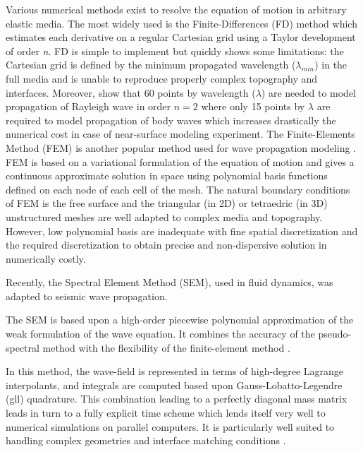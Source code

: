 \documentclass[manuscript,revised]{geophysics}
\begin{document}
\noindent Various numerical methods exist to resolve the equation of motion in arbitrary elastic media. The most widely used is the Finite-Differences (FD) method \citep{Virieux_PSV_1986,Levander_PSV_1988,Robertsson_FDM_1994,Pratt_EWM_1990,Stekl_VEM_1998,Saenger_FDM_2004} which estimates each derivative on a regular Cartesian grid using a Taylor development \citep{Moczo_FDM_2004} of order \textit{n}. FD is simple to implement but quickly shows some limitations: the Cartesian grid is defined by the minimum propagated wavelength ($\lambda_{min}$) in the full media and is unable to reproduce properly complex topography and interfaces. Moreover, \citet{Saenger_FDM_2000} show that 60 points by wavelength ($\lambda$) are needed to model propagation of Rayleigh wave in order $n=2$ where only 15 points by $\lambda$ are required to model propagation of body waves which increases drastically the numerical cost in case of near-surface modeling experiment. The Finite-Elements Method (FEM) is another popular method used for wave propagation modeling \citep{Lysmer_FEM_1972,Seron_FEM_1990,Hulbert_FEM_1990}. FEM is based on a variational formulation of the equation of motion and gives a continuous approximate solution in space using polynomial basis functions defined on each node of each cell of the mesh. The natural boundary conditions of FEM is the free surface and the triangular (in 2D) or tetraedric (in 3D) unstructured meshes are well adapted to complex media and topography. However, low polynomial basis are inadequate with fine spatial discretization and the required discretization to obtain precise and non-dispersive solution in numerically costly. 

\noindent Recently, the Spectral Element Method (SEM), used in fluid dynamics, was adapted to seismic wave propagation. 

\noindent The SEM is based upon a high-order piecewise polynomial approximation of the weak formulation of the wave equation. It combines the accuracy of the pseudo-spectral method with the flexibility of the finite-element method \citep{Tromp_SEM_2008}. 

\noindent In this method, the wave-field is represented in terms of high-degree Lagrange interpolants, and integrals are computed based upon Gauss-Lobatto-Legendre (gll) quadrature. This combination leading to a perfectly diagonal mass matrix leads in turn to a fully explicit time scheme which lends itself very well to numerical simulations on parallel computers. It is particularly well suited to handling complex geometries and interface matching conditions \citep{Cristini_SEM_2012}. 
\end{document}
